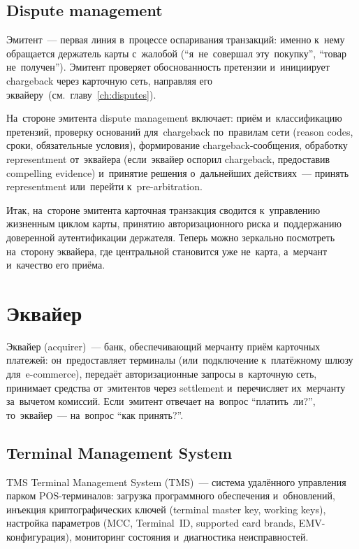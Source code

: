 \subsection*{Dispute management}

Эмитент~--- первая линия в~процессе оспаривания транзакций:
именно к~нему обращается держатель карты с~жалобой
(\enquote{я~не~совершал эту~покупку}, \enquote{товар
  не~получен}). Эмитент проверяет обоснованность претензии
и~инициирует chargeback через карточную сеть, направляя его
эквайеру~(см.~главу~\ref{ch:disputes}).

На~стороне эмитента dispute management включает: приём
и~классификацию претензий, проверку оснований для~chargeback
по~правилам сети (reason codes, сроки, обязательные
условия), формирование chargeback-сообщения, обработку
representment от~эквайера (если~эквайер оспорил chargeback,
предоставив compelling evidence) и~принятие решения
о~дальнейших действиях~--- принять representment или~перейти
к~pre-arbitration.


Итак, на~стороне эмитента карточная транзакция сводится
к~управлению жизненным циклом карты, принятию авторизационного
риска и~поддержанию доверенной аутентификации держателя. Теперь
можно зеркально посмотреть на~сторону эквайера, где центральной
становится уже не~карта, а~мерчант и~качество его приёма.

\section{Эквайер}
\label{sec:ia-acquirer}

Эквайер (acquirer)~--- банк, обеспечивающий мерчанту приём
карточных платежей: он~предоставляет терминалы (или~подключение
к~платёжному шлюзу для~e-commerce), передаёт авторизационные
запросы в~карточную сеть, принимает средства от~эмитентов
через settlement и~перечисляет их~мерчанту за~вычетом комиссий.
Если~эмитент отвечает на~вопрос \enquote{платить~ли?},
то~эквайер~--- на~вопрос \enquote{как принять?}.

\subsection*{Terminal Management System}

\begin{termdef}{TMS}
  Terminal Management System (TMS)~--- система удалённого
  управления парком POS-терминалов: загрузка программного
  обеспечения и~обновлений, инъекция криптографических ключей
  (terminal master key, working keys), настройка параметров
  (MCC, Terminal~ID, supported card brands, EMV-конфигурация),
  мониторинг состояния и~диагностика неисправностей.
\end{termdef}

